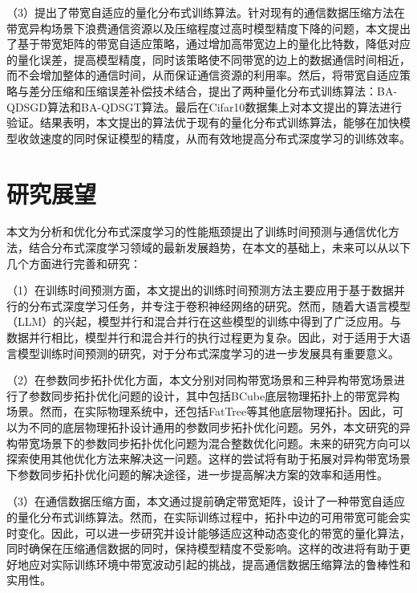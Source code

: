 （3）提出了带宽自适应的量化分布式训练算法。针对现有的通信数据压缩方法在带宽异构场景下浪费通信资源以及压缩程度过高时模型精度下降的问题，本文提出了基于带宽矩阵的带宽自适应策略，通过增加高带宽边上的量化比特数，降低对应的量化误差，提高模型精度，同时该策略使不同带宽的边上的数据通信时间相近，而不会增加整体的通信时间，从而保证通信资源的利用率。然后，将带宽自适应策略与差分压缩和压缩误差补偿技术结合，提出了两种量化分布式训练算法：BA-QDSGD算法和BA-QDSGT算法。最后在Cifar10数据集上对本文提出的算法进行验证。结果表明，本文提出的算法优于现有的量化分布式训练算法，能够在加快模型收敛速度的同时保证模型的精度，从而有效地提高分布式深度学习的训练效率。


\section{研究展望}

本文为分析和优化分布式深度学习的性能瓶颈提出了训练时间预测与通信优化方法，结合分布式深度学习领域的最新发展趋势，在本文的基础上，未来可以从以下几个方面进行完善和研究：

（1）在训练时间预测方面，本文提出的训练时间预测方法主要应用于基于数据并行的分布式深度学习任务，并专注于卷积神经网络的研究。然而，随着大语言模型（LLM）的兴起，模型并行和混合并行在这些模型的训练中得到了广泛应用。与数据并行相比，模型并行和混合并行的执行过程更为复杂。因此，对于适用于大语言模型训练时间预测的研究，对于分布式深度学习的进一步发展具有重要意义。

（2）在参数同步拓扑优化方面，本文分别对同构带宽场景和三种异构带宽场景进行了参数同步拓扑优化问题的设计，其中包括BCube底层物理拓扑上的带宽异构场景。然而，在实际物理系统中，还包括FatTree等其他底层物理拓扑。因此，可以为不同的底层物理拓扑设计通用的参数同步拓扑优化问题。另外，本文研究的异构带宽场景下的参数同步拓扑优化问题为混合整数优化问题。未来的研究方向可以探索使用其他优化方法来解决这一问题。这样的尝试将有助于拓展对异构带宽场景下参数同步拓扑优化问题的解决途径，进一步提高解决方案的效率和适用性。

（3）在通信数据压缩方面，本文通过提前确定带宽矩阵，设计了一种带宽自适应的量化分布式训练算法。然而，在实际训练过程中，拓扑中边的可用带宽可能会实时变化。因此，可以进一步研究并设计能够适应这种动态变化的带宽的量化算法，同时确保在压缩通信数据的同时，保持模型精度不受影响。这样的改进将有助于更好地应对实际训练环境中带宽波动引起的挑战，提高通信数据压缩算法的鲁棒性和实用性。